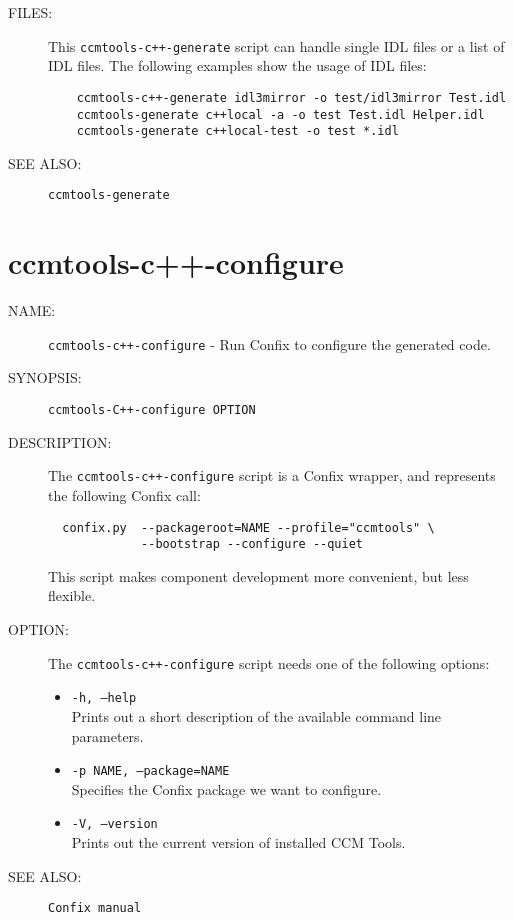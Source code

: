 \begin{description}
\item [FILES:]
  This {\tt ccmtools-c++-generate} script can handle single IDL files or a list of IDL
  files. The following examples show the usage of IDL files: 
  \begin{verbatim}
    ccmtools-c++-generate idl3mirror -o test/idl3mirror Test.idl
    ccmtools-generate c++local -a -o test Test.idl Helper.idl 
    ccmtools-generate c++local-test -o test *.idl
  \end{verbatim}

\item [SEE ALSO:]
  {\tt ccmtools-generate}
  
\end{description}


\section{ccmtools-c++-configure}
\begin{description}

\item [NAME:] 
  {\tt ccmtools-c++-configure} - Run Confix to configure the generated code.

\item [SYNOPSIS:] 
  {\tt ccmtools-C++-configure OPTION}

\item [DESCRIPTION:]
  The {\tt ccmtools-c++-configure} script is a Confix wrapper, and
  represents the following Confix call:
  \begin{small}
  \begin{verbatim}
  confix.py  --packageroot=NAME --profile="ccmtools" \
             --bootstrap --configure --quiet
  \end{verbatim}
  \end{small}
  This script makes component development more convenient,
  but less flexible. 

\item [OPTION:]
  The {\tt ccmtools-c++-configure} script needs one of the following options:
  \begin{itemize}
  \item {\tt -h, --help} \\
    Prints out a short description of the available command line parameters.

  \item {\tt -p NAME, --package=NAME} \\
    Specifies the Confix package we want to configure. 

  \item {\tt -V, --version} \\
    Prints out the current version of installed CCM Tools.
  \end{itemize}
  
\item [SEE ALSO:]
  {\tt Confix manual}
  
\end{description}


